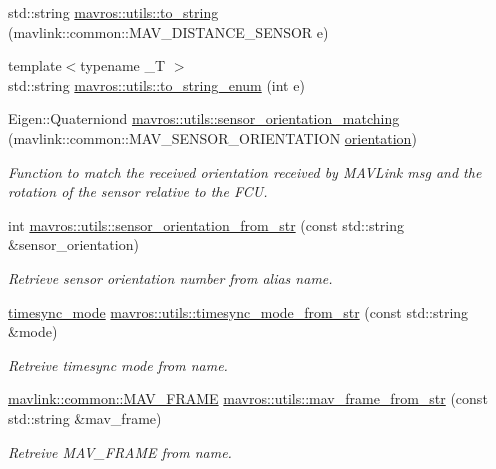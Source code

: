 \begin{DoxyCompactItemize}
\item 
std\+::string \mbox{\hyperlink{group__mavutils_ga5edcd4c7df23cca0ea720877f0fe4142}{mavros\+::utils\+::to\+\_\+string}} (mavlink\+::common\+::\+M\+A\+V\+\_\+\+D\+I\+S\+T\+A\+N\+C\+E\+\_\+\+S\+E\+N\+S\+OR e)
\item 
{\footnotesize template$<$typename \+\_\+T $>$ }\\std\+::string \mbox{\hyperlink{group__mavutils_ga80987ce0a2019df54e1fe62b7b53de7f}{mavros\+::utils\+::to\+\_\+string\+\_\+enum}} (int e)
\item 
Eigen\+::\+Quaterniond \mbox{\hyperlink{group__mavutils_ga9f21cd4e0233c34591600f8809c4fb2b}{mavros\+::utils\+::sensor\+\_\+orientation\+\_\+matching}} (mavlink\+::common\+::\+M\+A\+V\+\_\+\+S\+E\+N\+S\+O\+R\+\_\+\+O\+R\+I\+E\+N\+T\+A\+T\+I\+ON \mbox{\hyperlink{structorientation}{orientation}})
\begin{DoxyCompactList}\small\item\em Function to match the received orientation received by M\+A\+V\+Link msg and the rotation of the sensor relative to the F\+CU. \end{DoxyCompactList}\item 
int \mbox{\hyperlink{group__mavutils_ga0dc70c024ad33cd50af1c9e9bcfaa0c1}{mavros\+::utils\+::sensor\+\_\+orientation\+\_\+from\+\_\+str}} (const std\+::string \&sensor\+\_\+orientation)
\begin{DoxyCompactList}\small\item\em Retrieve sensor orientation number from alias name. \end{DoxyCompactList}\item 
\mbox{\hyperlink{group__mavutils_gac7f53712a7627f397d0eb145c2a16cf7}{timesync\+\_\+mode}} \mbox{\hyperlink{group__mavutils_gaacb385ef1414eb5c38c20f4f4d91d321}{mavros\+::utils\+::timesync\+\_\+mode\+\_\+from\+\_\+str}} (const std\+::string \&mode)
\begin{DoxyCompactList}\small\item\em Retreive timesync mode from name. \end{DoxyCompactList}\item 
\mbox{\hyperlink{include__v0_89_2mavlink__types_8h_aae9266d97d838a375605b69000c60617}{mavlink\+::common\+::\+M\+A\+V\+\_\+\+F\+R\+A\+ME}} \mbox{\hyperlink{group__mavutils_gaeecc00ce9cf4ea787c7309235e35cf8d}{mavros\+::utils\+::mav\+\_\+frame\+\_\+from\+\_\+str}} (const std\+::string \&mav\+\_\+frame)
\begin{DoxyCompactList}\small\item\em Retreive M\+A\+V\+\_\+\+F\+R\+A\+ME from name. \end{DoxyCompactList}\end{DoxyCompactItemize}


